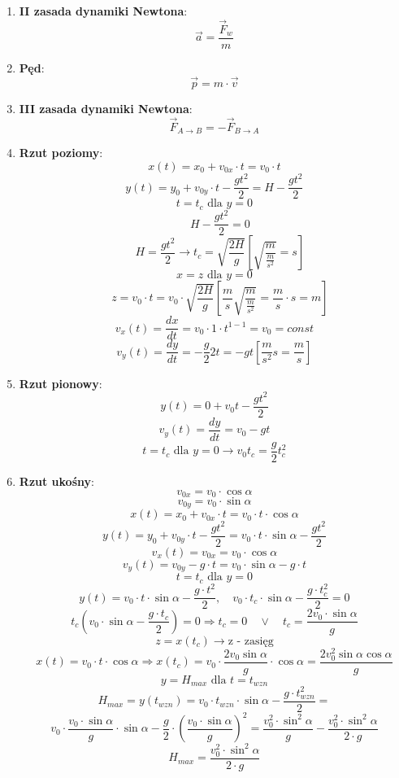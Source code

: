 \documentclass{article}
\begin{document}
\begin{enumerate}
		\item \textbf{II zasada dynamiki Newtona}:
		\[
		\vec{a} = \frac{\vec{F}_w}{m}
		\]
		
		\item \textbf{Pęd}:
		\[
		\vec{p} = m \cdot \vec{v}
		\]
		
		\item \textbf{III zasada dynamiki Newtona}:
		\[
		\vec{F}_{A \to B} = -\vec{F}_{B \to A}
		\]
		
		\item \textbf{Rzut poziomy}:
		\[
		x(t) = x_0 + v_{0x} \cdotp t = v_0 \cdotp t
		\]
		\[
		y(t) = y_0 + v_{0y} \cdotp t - \frac{gt^2}{2} = H - \frac{gt^2}{2}
		\]
		\[
		t = t_c \text{ dla } y = 0
		\]
		\[
		\quad H - \frac{gt^2}{2} = 0
		\]
		\[
		\quad H = \frac{gt^2}{2} \rightarrow t_c = \sqrt{\frac{2H}{g}} \left[ \sqrt{\frac{m}{\frac{m}{s^2}}} = s \right]
		\]
		\[
		x = z \text{ dla } y = 0
		\]
		\[
		\quad z = v_0 \cdotp t = v_0 \cdotp \sqrt{\frac{2H}{g}} \left[ \frac{m}{s} \sqrt{\frac{m}{\frac{m}{s^2}}} = \frac{m}{s} \cdotp s = m \right]
		\]
		\[
		v_x(t) = \frac{dx}{dt} = v_0 \cdotp 1 \cdotp t^{1-1} = v_0 = const
		\]
		\[
		v_y(t) = \frac{dy}{dt} = - \frac{g}{2} 2t = -gt \left[ \frac{m}{s^2}s = \frac{m}{s} \right]
		\]
		
		\item \textbf{Rzut pionowy}:
		\[
		y(t) = 0 + v_0t - \frac{gt^2}{2}
		\]
		\[
		v_y(t) = \frac{dy}{dt} = v_0 - gt
		\]
		\[
		t = t_c \text{ dla } y = 0 \rightarrow v_0t_c = \frac{g}{2} t_c^2
		\]
		
		\item \textbf{Rzut ukośny}:
		\[
		v_{0x} = v_0 \cdotp \cos\alpha
		\]
		\[
		v_{0y} = v_0 \cdotp \sin\alpha
		\]
		\[
		x(t) = x_0 + v_{0x} \cdotp t = v_0 \cdotp t \cdotp \cos\alpha
		\]
		\[
		y(t) = y_0 + v_{0y} \cdotp t - \frac{gt^2}{2} = v_0 \cdotp t \cdotp \sin\alpha - \frac{gt^2}{2}
		\]
		\[
		v_x(t) = v_{0x} = v_0 \cdotp \cos\alpha
		\]
		\[
		v_y(t) = v_{0y} - g \cdotp t = v_0 \cdotp \sin\alpha - g \cdotp t
		\]
		\[
		t = t_c \text{ dla } y = 0
		\]
		\[
		y(t) = v_0 \cdotp t \cdotp \sin\alpha - \frac{g \cdotp t^2}{2}, \quad v_0 \cdotp t_c \cdotp \sin\alpha - \frac{g \cdotp t_c^2}{2} = 0
		\]
		\[
		t_c \left( v_0 \cdotp \sin\alpha - \frac{g \cdotp t_c}{2} \right) = 0 \Rightarrow t_c = 0 \quad \vee \quad t_c = \frac{2v_0 \cdot \sin\alpha}{g}
		\]
		\[
		z = x(t_c) \longrightarrow \text{z - zasięg}
		\]
		\[
		x(t) = v_0 \cdot t \cdotp \cos\alpha \Rightarrow x(t_c) = v_0 \cdotp \frac{2v_0\sin\alpha}{g} \cdotp \cos\alpha = \frac{2v_0^2 \sin\alpha \cos\alpha}{g}
		\]
		\[
		y = H_{max} \text{ dla } t = t_{wzn}
		\]
		\[
		H_{max} = y(t_{wzn}) = v_0 \cdotp t_{wzn} \cdotp \sin\alpha - \frac{g \cdotp t_{wzn}^2}{2} =
		\]
		\[
		 v_0 \cdotp \frac{v_0 \cdotp \sin\alpha}{g} \cdotp \sin\alpha - \frac{g}{2} \cdotp \left( \frac{v_0 \cdotp \sin\alpha}{g} \right)^2 = \frac{v_0^2 \cdotp \sin^2 \alpha}{g} - \frac{v_0^2 \cdotp \sin^2 \alpha}{2 \cdotp g}
		\]
		\[
		H_{max} = \frac{v_0^2 \cdotp \sin^2 \alpha}{2 \cdotp g}
		\]
		

\end{enumerate}
\end{document}
